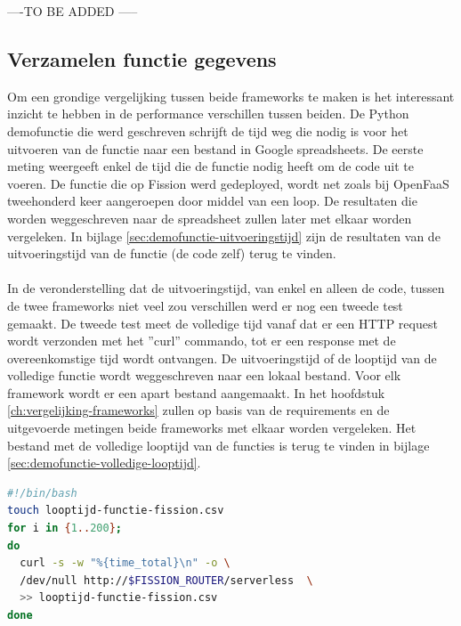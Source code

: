 ----TO BE ADDED -----

\subsection{Verzamelen functie gegevens}
Om een grondige vergelijking tussen beide frameworks te maken is het interessant inzicht te hebben in de performance verschillen tussen beiden. De Python demofunctie die werd geschreven schrijft de tijd weg die nodig is voor het uitvoeren van de functie naar een bestand in Google spreadsheets. De eerste meting weergeeft enkel de tijd die de functie nodig heeft om de code uit te voeren. De functie die op Fission werd gedeployed, wordt net zoals bij OpenFaaS tweehonderd keer aangeroepen door middel van een loop. De resultaten die worden weggeschreven naar de spreadsheet zullen later met elkaar worden vergeleken. In bijlage \ref{sec:demofunctie-uitvoeringstijd} zijn de resultaten van de uitvoeringstijd van de functie (de code zelf) terug te vinden. 
\\\\
In de veronderstelling dat de uitvoeringstijd, van enkel en alleen de code, tussen de twee frameworks niet veel zou verschillen werd er nog een tweede test gemaakt. De tweede test meet de volledige tijd vanaf dat er een HTTP request wordt verzonden met het ''curl'' commando, tot er een response met de overeenkomstige tijd wordt ontvangen. De uitvoeringstijd of de looptijd van de volledige functie wordt weggeschreven naar een lokaal bestand. Voor elk framework wordt er een apart bestand aangemaakt. In het hoofdstuk \ref{ch:vergelijking-frameworks} zullen op basis van de requirements en de uitgevoerde metingen beide frameworks met elkaar worden vergeleken. Het bestand met de volledige looptijd van de functies is terug te vinden in bijlage \ref{sec:demofunctie-volledige-looptijd}.

\begin{lstlisting}[language=bash]
#!/bin/bash
touch looptijd-functie-fission.csv
for i in {1..200};
do
  curl -s -w "%{time_total}\n" -o \
  /dev/null http://$FISSION_ROUTER/serverless  \
  >> looptijd-functie-fission.csv
done
\end{lstlisting}
